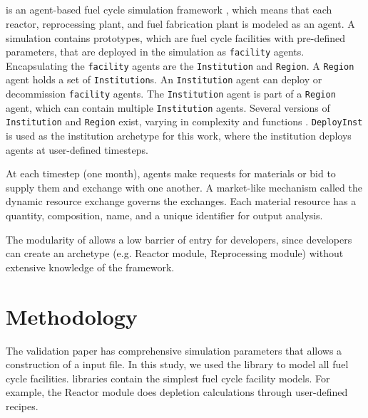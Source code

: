 \subsection{\Cyclus}

\Cyclus is an agent-based fuel cycle simulation framework 
\cite{huff_fundamental_2016}, which means 
that each reactor, reprocessing plant, and fuel fabrication plant is modeled as an agent.
A \Cyclus simulation contains prototypes, which are fuel cycle facilities with
pre-defined parameters, that are deployed in the simulation as \texttt{facility} agents.
Encapsulating the \texttt{facility} agents are the \texttt{Institution} and \texttt{Region}.
A \texttt{Region} agent holds a set of \texttt{Institution}s.
An \texttt{Institution} agent can deploy or decommission \texttt{facility} agents.
The \texttt{Institution} agent is part of a \texttt{Region} agent,
which can contain multiple \texttt{Institution} agents. Several versions of \texttt{Institution}
and \texttt{Region} exist, varying in complexity and functions \cite{huff_extensions_2014}.
 \texttt{DeployInst} is used as the institution archetype for this work, where the institution
deploys agents at user-defined timesteps.

At each timestep (one month),
agents make requests for materials or bid to supply them and exchange
with one another. A market-like mechanism called the dynamic resource exchange
\cite{gidden_agent-based_2015} governs the exchanges.
Each material resource has a quantity, composition, name, and a unique identifier
for output analysis.

The modularity of \Cyclus allows a low barrier of
entry for developers, since developers can create an
archetype (e.g. Reactor module, Reprocessing module)
without extensive knowledge of the \Cyclus framework.


\section{Methodology}

The validation paper \cite{feng_standardized_2016}
has comprehensive simulation parameters that allows
a construction of a \Cyclus input file. In this
study, we used the \Cycamore library to model
all fuel cycle facilities. \Cycamore libraries contain
the simplest fuel cycle facility models. For example,
the Reactor module does depletion calculations through
user-defined recipes.